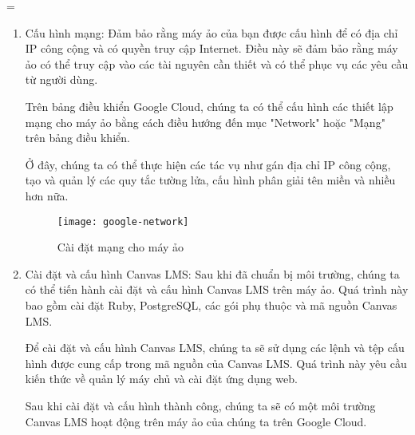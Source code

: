 =\documentclass[../Thesis.tex]{subfiles}
\begin{document}
\begin{enumerate}
        \item Cấu hình mạng: Đảm bảo rằng máy ảo của bạn được cấu hình để có địa chỉ IP công cộng và có quyền truy cập Internet. Điều này sẽ đảm bảo rằng máy ảo có thể truy cập vào các tài nguyên cần thiết và có thể phục vụ các yêu cầu từ người dùng.

        Trên bảng điều khiển Google Cloud, chúng ta có thể cấu hình các thiết lập mạng cho máy ảo bằng cách điều hướng đến mục "Network" hoặc "Mạng" trên bảng điều khiển.
        
        Ở đây, chúng ta có thể thực hiện các tác vụ như gán địa chỉ IP công cộng, tạo và quản lý các quy tắc tường lửa, cấu hình phân giải tên miền và nhiều hơn nữa.

        \begin{figure}[hbt!]
            \centering\texttt{[image: google-network]}
            \caption{Cài đặt mạng cho máy ảo}
            \label{fig:google-network}
        \end{figure}
        \FloatBarrier

        \item Cài đặt và cấu hình Canvas LMS: Sau khi đã chuẩn bị môi trường, chúng ta có thể tiến hành cài đặt và cấu hình Canvas LMS trên máy ảo. Quá trình này bao gồm cài đặt Ruby, PostgreSQL, các gói phụ thuộc và mã nguồn Canvas LMS.

        Để cài đặt và cấu hình Canvas LMS, chúng ta sẽ sử dụng các lệnh và tệp cấu hình được cung cấp trong mã nguồn của Canvas LMS. Quá trình này yêu cầu kiến thức về quản lý máy chủ và cài đặt ứng dụng web.
        
        Sau khi cài đặt và cấu hình thành công, chúng ta sẽ có một môi trường Canvas LMS hoạt động trên máy ảo của chúng ta trên Google Cloud.
    \end{enumerate}
\end{document}
